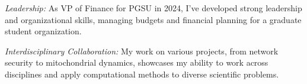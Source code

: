 \begin{contributions}
\textit{Leadership:} As VP of Finance for PGSU in 2024, I've developed strong leadership and organizational skills, managing budgets and financial planning for a graduate student organization.


\textit{Interdisciplinary Collaboration:} My work on various projects, from network security to mitochondrial dynamics, showcases my ability to work across disciplines and apply computational methods to diverse scientific problems.
\end{contributions}
    
    